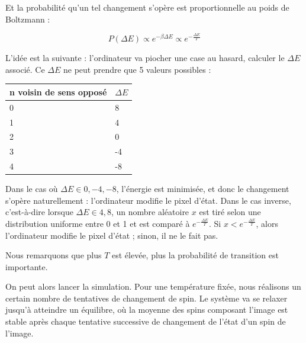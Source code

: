 \documentclass[11pt, parskip=half]{scrartcl} %
\begin{document}
Et la probabilité qu'un tel changement s'opère est proportionnelle au poids de Boltzmann :

\begin{equation*}
	P(\Delta E) \propto e^{-\beta \Delta E} \propto e^{-\frac{\Delta E}{T}}
\end{equation*}

L'idée est la suivante : l'ordinateur va piocher une case au hasard, calculer le $\Delta E$ associé. Ce $\Delta E$ ne peut prendre que 5 valeurs possibles :

\begin{center}
	\begin{tabular}{|l|m{4cm}|}
		\hline
		n voisin de sens opposé & $\Delta E $ \\
		\hline
		0                       & 8           \\
		1                       & 4           \\
		2                       & 0           \\
		3                       & -4          \\
		4                       & -8          \\\hline
	\end{tabular}
\end{center}

\vspace{4mm}

Dans le cas où $\Delta E \in {0, -4, -8}$, l'énergie est minimisée, et donc le changement s'opère naturellement : l'ordinateur modifie le pixel d'état. Dans le cas inverse, c'est-à-dire lorsque $\Delta E \in {4, 8}$, un nombre aléatoire $x$ est tiré selon une distribution uniforme entre 0 et 1 et est comparé à $e^{-\frac{\Delta E}{T}}$. Si $x < e^{-\frac{\Delta E}{T}}$, alors l'ordinateur modifie le pixel d'état ; sinon, il ne le fait pas.

Nous remarquons que plus $T$ est élevée, plus la probabilité de transition est importante.

On peut alors lancer la simulation. Pour une température fixée, nous réalisons un certain nombre de tentatives de changement de spin. Le système va se relaxer jusqu'à atteindre un équilibre, où la moyenne des spins composant l'image est stable après chaque tentative successive de changement de l'état d'un spin de l'image.
\end{document}
